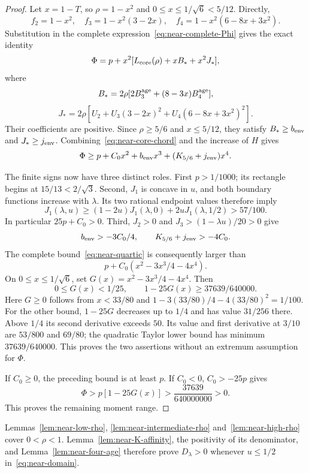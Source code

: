 \begin{proof}
Let $x=1-T$, so $\rho=1-x^2$ and $0\le x\le1/\sqrt6<5/12$. Directly,
\[
 f_2=1-x^2,\quad f_3=1-x^2(3-2x),\quad
 f_4=1-x^2(6-8x+3x^2).
\]
Substitution in the complete expression~\eqref{eq:near-complete-Phi} gives the exact identity
\begin{equation}\label{eq:near-recovery-identity}
 \Phi=p+x^2[L_{\rm core}(\rho)+xB_*+x^2J_*],
\end{equation}
where
\[
 B_*=2\rho[2B_3^{\rm age}+(8-3x)B_4^{\rm age}],
\]
\[
 J_*=2\rho[U_2+U_3(3-2x)^2+U_4(6-8x+3x^2)^2].
\]
Their coefficients are positive. Since $\rho\ge5/6$ and $x\le5/12$, they satisfy $B_*\ge b_{\rm env}$ and $J_*\ge j_{\rm env}$. Combining~\eqref{eq:near-core-chord} and the increase of $H$ gives
\begin{equation}\label{eq:near-quartic}
 \Phi\ge p+C_0x^2+b_{\rm env}x^3+(K_{5/6}+j_{\rm env})x^4.
\end{equation}

The finite signs now have three distinct roles. First $p>1/1000$; its rectangle begins at $15/13<2/\sqrt3$. Second, $J_1$ is concave in $u$, and both boundary functions increase with $\lambda$. Its two rational endpoint values therefore imply
\[
 J_1(\lambda,u)\ge(1-2u)J_1(\lambda,0)+2uJ_1(\lambda,1/2)>57/100.
\]
In particular $25p+C_0>0$. Third, $J_2>0$ and $J_3>(1-\lambda u)/20>0$ give
\[
 b_{\rm env}>-3C_0/4,\qquad K_{5/6}+j_{\rm env}>-4C_0.
\]
The complete bound~\eqref{eq:near-quartic} is consequently larger than
\[
 p+C_0(x^2-3x^3/4-4x^4).
\]
On $0\le x\le1/\sqrt6$, set $G(x)=x^2-3x^3/4-4x^4$. Then
\[
 0\le G(x)<1/25,\qquad 1-25G(x)\ge37639/640000.
\]
Here $G\ge0$ follows from $x<33/80$ and $1-3(33/80)/4-4(33/80)^2=1/100$. For the other bound, $1-25G$ decreases up to $1/4$ and has value $31/256$ there. Above $1/4$ its second derivative exceeds $50$. Its value and first derivative at $3/10$ are $53/800$ and $69/80$; the quadratic Taylor lower bound has minimum $37639/640000$. This proves the two assertions without an extremum assumption for $\Phi$.

If $C_0\ge0$, the preceding bound is at least $p$. If $C_0<0$, $C_0>-25p$ gives
\[
 \Phi>p[1-25G(x)]>\frac{37639}{640000000}>0.
\]
This proves the remaining moment range.
\end{proof}

Lemmas~\ref{lem:near-low-rho}, \ref{lem:near-intermediate-rho} and~\ref{lem:near-high-rho} cover $0<\rho<1$. Lemma~\ref{lem:near-K-affinity}, the positivity of its denominator, and Lemma~\ref{lem:near-four-age} therefore prove $D_\lambda>0$ whenever $u\le1/2$ in~\eqref{eq:near-domain}.

